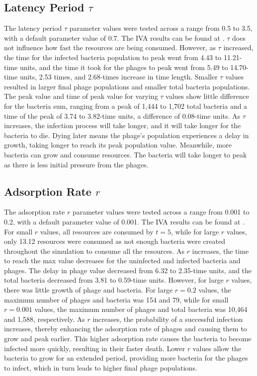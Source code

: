 \subsection{Latency Period $\tau$}
The latency period $\tau$ parameter values were tested across a range from 0.5 to 3.5, with a default parameter value of 0.7. 
The IVA results can be found at . 
$\tau$ does not influence how fast the resources are being consumed. 
However, as $\tau$ increased, the time for the infected bacteria population to peak went from 4.43 to 11.21-time units, and the time it took for the phages to peak went from 5.49 to 14.70-time units, 2.53 times, and 2.68-times increase in time length. 
Smaller $\tau$ values resulted in larger final phage populations and smaller total bacteria populations. 
The peak value and time of peak value for varying $\tau$ values show little difference for the bacteria sum, ranging from a peak of 1,444 to 1,702 total bacteria and a time of the peak of 3.74 to 3.82-time units, a difference of 0.08-time units. 
As $\tau$ increases, the infection process will take longer, and it will take longer for the bacteria to die. 
Dying later means the phage’s population experiences a delay in growth, taking longer to reach its peak population value. 
Meanwhile, more bacteria can grow and consume resources. 
The bacteria will take longer to peak as there is less initial pressure from the phages. 

\subsection{Adsorption Rate $r$}
The adsorption rate $r$ parameter values were tested across a range from 0.001 to 0.2, with a default parameter value of 0.001. 
The IVA results can be found at . 
For small $r$ values, all resources are consumed by $t=5$, while for large $r$ values, only 13.12 resources were consumed as not enough bacteria were created throughout the simulation to consume all the resources. 
As $r$ increases, the time to reach the max value decreases for the uninfected and infected bacteria and phages. The delay in phage value decreased from 6.32 to 2.35-time units, and the total bacteria decreased from 3.81 to 0.59-time units. 
However, for large $r$ values, there was little growth of phage and bacteria. 
For large $r=0.2$ values, the maximum number of phages and bacteria was 154 and 79, while for small $r=0.001$ values, the maximum number of phages and total bacteria was 10,464 and 1,588, respectively. 
As $r$ increases, the probability of a successful infection increases, thereby enhancing the adsorption rate of phages and causing them to grow and peak earlier. 
This higher adsorption rate causes the bacteria to become infected more quickly, resulting in their faster death. 
Lower $r$ values allow the bacteria to grow for an extended period, providing more bacteria for the phages to infect, which in turn leads to higher final phage populations.

